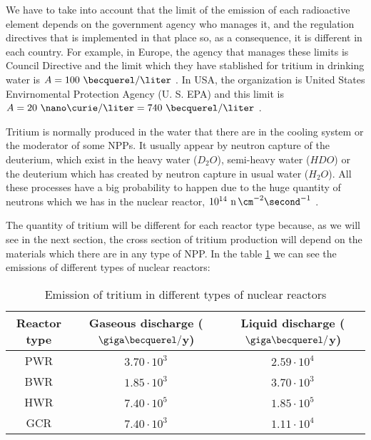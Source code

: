 We have to take into account that the limit of the emission of each radioactive element depends on the government agency who manages it, and the regulation directives that is implemented in that place so, as a consequence, it is different in each country. For example, in Europe, the agency that manages these limits is Council Directive and the limit which they have stablished for tritium in drinking water is $A = 100~\becquerel/\liter$ \cite{100BqL}. In USA, the organization is United States Envirnomental Protection Agency (U. S. EPA) and this limit is $A = 20~\nano\curie/\liter = 740~\becquerel/\liter$ \cite{740BqL}.

Tritium is normally produced in the water that there are in the cooling system or the moderator of some NPPs. It usually appear by neutron capture of the deuterium, which exist in the heavy water ($D_2 O$), semi-heavy water ($H D O$) or the deuterium which has created by neutron capture in usual water ($H_2 O$). All these processes have a big probability to happen due to the huge quantity of neutrons which we has in the nuclear reactor, $10^{14} ~\ce{n} \, \cm^{-2} \second^{-1}$ \cite{CrossSeccionNeutrons}. 

The quantity of tritium will be different for each reactor type because, as we will see in the next section, the cross section of tritium production will depend on the materials which there are in any type of NPP. In the table \ref{tab:TritiumEmisionsNPPs} we can see the emissions of different types of nuclear reactors:

\begin{table}[htbp]
\begin{center}
\begin{tabular}{|c|c|c|}
\hline
Reactor type & Gaseous discharge ($\giga\becquerel/$y) & Liquid discharge ($\giga\becquerel/$y) \\
\hline \hline \hline
PWR & $3.70\cdot 10^{3}$ & $2.59\cdot 10^{4}$ \\ \hline
BWR & $1.85\cdot 10^{3}$ & $3.70\cdot 10^{3}$ \\ \hline
HWR & $7.40\cdot 10^{5}$ & $1.85\cdot 10^{5}$ \\ \hline
GCR & $7.40\cdot 10^{3}$ & $1.11\cdot 10^{4}$ \\ \hline
\end{tabular}
\caption{Emission of tritium in different types of nuclear reactors\cite{CommonEmissionTritium}}
\label{tab:TritiumEmisionsNPPs}
\end{center}
\end{table} 

